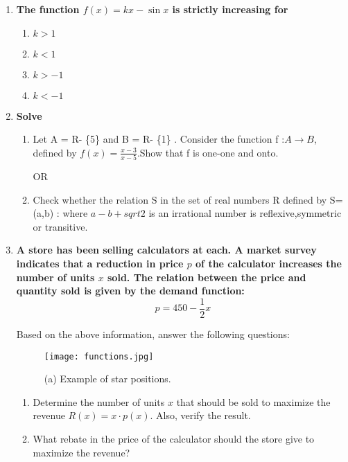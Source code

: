 \documentclass{article}
\begin{document}
\begin{enumerate}[label=\textbf{\arabic*.}] %
    \item \textbf{The function \( f(x) = kx - \sin x \) is strictly increasing for}
    
    \begin{enumerate}[label=\Alph*)] %
        \item \( k > 1 \)
        \item \( k < 1 \)
        \item \( k > -1 \)
        \item \( k < -1 \)
    \end{enumerate}

    \item \textbf{Solve}
    
    \begin{enumerate}[label=\alph*)] %
    \item Let A = R- \{5\} and B = R- \{1\} . Consider the function f :$A \rightarrow B$, defined by $f(x) = \frac{x-3}{x-5}$.Show that f is one-one and onto.
        
         \begin{center}
        OR
        \end{center}
        
        \item Check whether the relation S in the set of real numbers R defined by S=(a,b) : where $a-b+sqrt{2}$ is an irrational number is reflexive,symmetric or transitive.
        \end{enumerate}


\item \textbf{A store has been selling calculators at  each. A market survey indicates that a reduction in price \( p \) of the calculator increases the number of units \( x \) sold. The relation between the price and quantity sold is given by the demand function:}
    \[
    p = 450 - \frac{1}{2} x
    \]

    Based on the above information, answer the following questions:
    
    \begin{figure}[h] %
        \centering
        \texttt{[image: functions.jpg]} %
        \caption{(a) Example of star positions.}
        \label{fig:star-positions}
    \end{figure}

    \begin{enumerate}
        \item Determine the number of units \( x \) that should be sold to maximize the revenue \( R(x) = x \cdot p(x) \). Also, verify the result.
        \item What rebate in the price of the calculator should the store give to maximize the revenue?
    \end{enumerate}

\end{enumerate}
\end{document}
